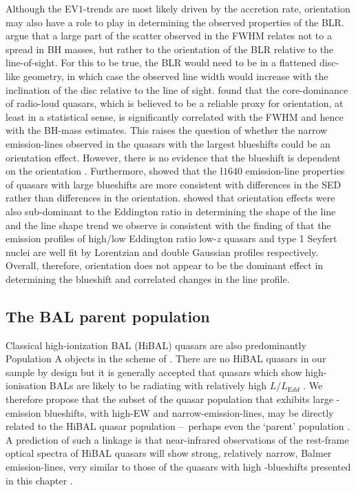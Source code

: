 Although the EV$1$-trends \citep{sulentic00b,shen14} are most likely driven by the accretion rate, orientation may also have a role to play in determining the observed properties of the BLR. 
\citet{shen14} argue that a large part of the scatter observed in the \hb FWHM relates not to a spread in BH masses, but rather to the orientation of the BLR relative to the line-of-sight.
For this to be true, the BLR would need to be in a flattened disc-like geometry, in which case the observed line width would increase with the inclination of the disc relative to the line of sight. 
\citet{brotherton15b} found that the core-dominance of radio-loud quasars, which is believed to be a reliable proxy for orientation, at least in a statistical sense, is significantly correlated with the \hb FWHM and hence with the BH-mass estimates. 
This raises the question of whether the narrow \ha emission-lines observed in the quasars with the largest  blueshifts could be an orientation effect. 
However, there is no evidence that the  blueshift is dependent on the orientation \citep[inferred from the radio core-dominance;][]{richards11,runnoe14}. 
Furthermore, \citet{leighly04} showed that the \l$1640$ emission-line properties of quasars with large  blueshifts are more consistent with differences in the SED rather than differences in the orientation.
\citet{collin06} showed that orientation effects were also sub-dominant to the Eddington ratio in determining the shape of the \hb line and
the \ha line shape trend we observe is consistent with the finding of \citet{marziani03} that the \hb emission profiles of high/low Eddington ratio low-$z$ quasars and type 1 Seyfert nuclei are well fit by Lorentzian and double Gaussian profiles respectively.  
Overall, therefore, orientation does not appear to be the dominant effect in determining the  blueshift and correlated changes in the \ha line profile. 

\subsection{The BAL parent population}

Classical high-ionization BAL (HiBAL) quasars are also predominantly Population A objects in the scheme of \citet{sulentic00b}. 
There are no HiBAL quasars in our sample by design but it is generally accepted that quasars which show high-ionisation BALs are likely to be radiating with relatively high $L/L_{\mathrm Edd}$ \citep[e.g.][]{zhang14}. 
We therefore propose that the subset of the quasar population that exhibits large -emission blueshifts, with high-EW and narrow-\ha emission-lines, may be directly related to the HiBAL quasar population \---\ perhaps even the `parent' population \citep{richards06conf}. 
A prediction of such a linkage is that near-infrared observations of the rest-frame optical spectra of HiBAL quasars will show strong, relatively narrow, Balmer emission-lines, very similar to those of the quasars with high -blueshifts presented in this chapter \citep[see][for such a study]{runnoe13b}. 

